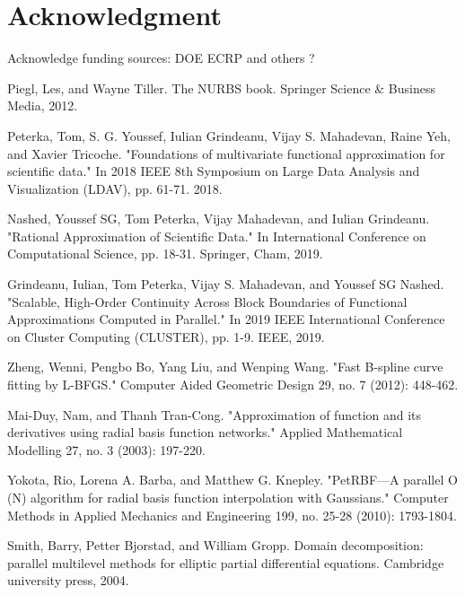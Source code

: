 \documentclass[conference]{IEEEtran}
\begin{document}
\section*{Acknowledgment}

Acknowledge funding sources: DOE ECRP and others ?


\begin{thebibliography}{00}

 Piegl, Les, and Wayne Tiller. The NURBS book. Springer Science \& Business Media, 2012.

 Peterka, Tom, S. G. Youssef, Iulian Grindeanu, Vijay S. Mahadevan, Raine Yeh, and Xavier Tricoche. "Foundations of multivariate functional approximation for scientific data." In 2018 IEEE 8th Symposium on Large Data Analysis and Visualization (LDAV), pp. 61-71. 2018.

 Nashed, Youssef SG, Tom Peterka, Vijay Mahadevan, and Iulian Grindeanu. "Rational Approximation of Scientific Data." In International Conference on Computational Science, pp. 18-31. Springer, Cham, 2019.

 Grindeanu, Iulian, Tom Peterka, Vijay S. Mahadevan, and Youssef SG Nashed. "Scalable, High-Order Continuity Across Block Boundaries of Functional Approximations Computed in Parallel." In 2019 IEEE International Conference on Cluster Computing (CLUSTER), pp. 1-9. IEEE, 2019.


 Zheng, Wenni, Pengbo Bo, Yang Liu, and Wenping Wang. "Fast B-spline curve fitting by L-BFGS." Computer Aided Geometric Design 29, no. 7 (2012): 448-462.

 Mai-Duy, Nam, and Thanh Tran-Cong. "Approximation of function and its derivatives using radial basis function networks." Applied Mathematical Modelling 27, no. 3 (2003): 197-220.

 Yokota, Rio, Lorena A. Barba, and Matthew G. Knepley. "PetRBF—A parallel O (N) algorithm for radial basis function interpolation with Gaussians." Computer Methods in Applied Mechanics and Engineering 199, no. 25-28 (2010): 1793-1804.

 Smith, Barry, Petter Bjorstad, and William Gropp. Domain decomposition: parallel multilevel methods for elliptic partial differential equations. Cambridge university press, 2004.


\end{thebibliography}
\end{document}
